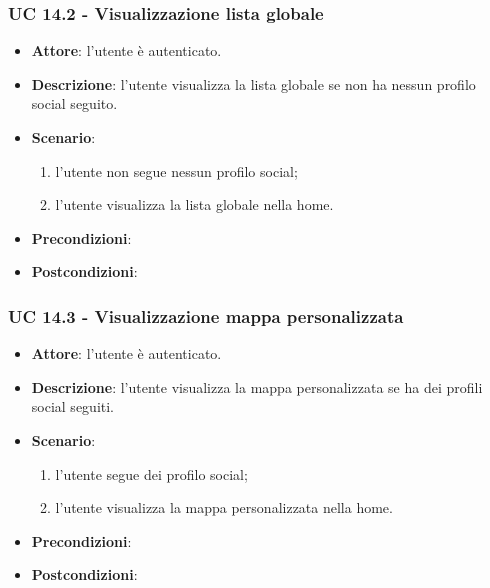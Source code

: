 \subsubsection{UC 14.2 - Visualizzazione lista globale}
\begin{itemize}
    \item \textbf{Attore}: l'utente è autenticato.
    \item \textbf{Descrizione}: l'utente visualizza la lista globale se non ha nessun profilo social seguito.
    \item \textbf{Scenario}:
    \begin{enumerate}
        \item l'utente non segue nessun profilo social;
        \item l'utente visualizza la lista globale nella home.
    \end{enumerate}

    \item \textbf{Precondizioni}: %
    \item \textbf{Postcondizioni}: %

\end{itemize}

\subsubsection{UC 14.3 - Visualizzazione mappa personalizzata}
\begin{itemize}
    \item \textbf{Attore}: l'utente è autenticato.
    \item \textbf{Descrizione}: l'utente visualizza la mappa personalizzata se ha dei profili social seguiti.
    \item \textbf{Scenario}:
    \begin{enumerate}
        \item l'utente segue dei profilo social;
        \item l'utente visualizza la mappa personalizzata nella home.
    \end{enumerate}

    \item \textbf{Precondizioni}: %
    \item \textbf{Postcondizioni}: %
\end{itemize}

